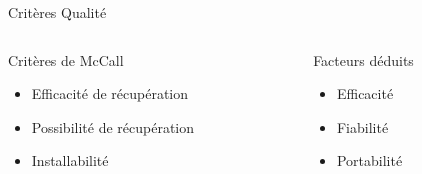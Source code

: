 \author{Martin \textsc{Gaborit}}

\begin{frame}{Critères Qualité}
  \begin{columns}[t]
    \begin{column}{5.5cm}
      \begin{block}{Critères de McCall}
	\onslide<2,3,4,5,6,7>
	\begin{itemize}
	\item Efficacité de récupération
	\onslide<4,5,6,7>
	\item Possibilité de récupération
	\onslide<6,7>
	\item Installabilité
	\end{itemize}
      \end{block}
    \end{column}

    \begin{column}{5.5cm}
      \begin{block}{Facteurs déduits}
	\onslide<2>
	\begin{itemize}
	  \item Efficacité
	  \onslide<5,6,7>
	  \item Fiabilité
	  \onslide<7>
	  \item Portabilité
	\end{itemize}
      \end{block}
    \end{column}
  \end{columns}
\end{frame}
